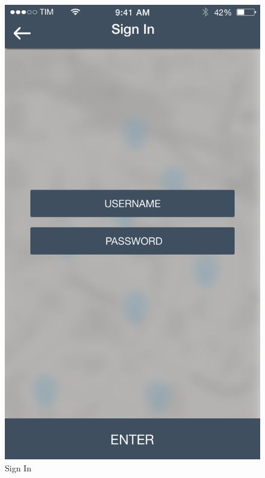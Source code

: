\documentclass[12pt]{article}
\begin{document}
 	 	\begin{figure}
		 \centering	
		 \includegraphics[scale=0.25]{Images/SignIn.png}
		 \caption{Sign In}
		 \endminipage
		 \centering

\end{figure}
\end{document}

